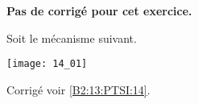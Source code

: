 \normalfalse \difficiletrue \tdifficilefalse
\correctionfalse


\setcounter{numques}{0}
\ifcorrection
\else
\textbf{Pas de corrigé pour cet exercice.}
\fi

\ifprof
\else
Soit le mécanisme suivant. 

\begin{center}
\texttt{[image: 14\_01]}
\end{center}
\fi


\ifprof
\else
\fi



\ifprof
\else
\footnotesize
\ifcolle
\else
\fi
\normalsize

\begin{flushright}
\footnotesize{Corrigé  voir \ref{B2:13:PTSI:14}.}
\end{flushright}%
\fi